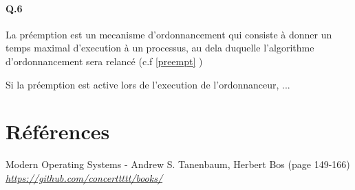 \documentclass[10pt]{article}
\begin{document}
\paragraph{Q.6}
La préemption est un mecanisme d'ordonnancement qui consiste à donner un temps maximal d'execution à un processus,
au dela duquelle l'algorithme d'ordonnancement sera relancé (c.f \ref{preempt} )

Si la préemption est active lors de l'execution de l'ordonnanceur, ...
 
    \newpage
    \section{Références}
    \begin{thebibliography}{}

        \label{modernos}
        Modern Operating Systems - Andrew S. Tanenbaum, Herbert Bos (page 149-166)\newline
        \href{https://github.com/concerttttt/books/blob/master/Modern Operating Systems 4th Edition--Andrew Tanenbaum.pdf}
        {\textit{https://github.com/concerttttt/books/}}\newline
        
    \end{thebibliography}
    
\end{document}

